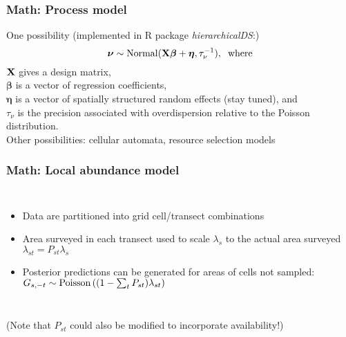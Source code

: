 \documentclass[serif,mathserif]{beamer}
\begin{document}
\begin{frame}
  \frametitle{Math: Process model}
    {\color{noaaturq} One possibility (implemented in R package {\it hierarchicalDS}:)}
    $$
    \boldsymbol{\nu} \sim {\rm Normal}({\bf X}\boldsymbol{\beta}+\boldsymbol{\eta},\tau_\nu^{-1})
    , \hspace{2mm} {\rm where}
    $$
    ${\bf X}$ gives a design matrix, \\ \vspace{2mm}
    $\boldsymbol{\beta}$ is a vector of regression coefficients, \\ \vspace{2mm}
    $\boldsymbol{\eta}$ is a vector of spatially structured random effects (stay tuned), and \\ \vspace{2mm}
    $\tau_\nu$ is the precision associated with overdispersion relative to the Poisson distribution.\\
    \vspace{4mm}
    {\color{noaaturq} Other possibilities: cellular automata, resource selection models}
\end{frame}


\begin{frame}
  \frametitle{Math: Local abundance model}
    \begin{columns}[c]
    \column{2.5in}
    \column{2.5in}
      \begin{itemize}
        \item Data are partitioned into grid cell/transect combinations \pause
        \item Area surveyed in each transect used to scale $\lambda_{s}$ to the actual area surveyed $\lambda_{st}=P_{st}\lambda_s$  \pause
        \item Posterior predictions can be generated for areas of cells not sampled: $G_{s,-t} \sim {\rm Poisson}\left( (1-\sum_t P_{st})\lambda_{st} \right)$ \pause
      \end{itemize}
   \end{columns}
   \vspace{.5in}
   {\color{noaaturq} (Note that $P_{st}$ could also be modified to incorporate availability!)}
\end{frame}
\end{document}
